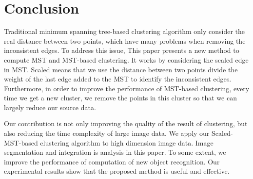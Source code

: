 \section{Conclusion}
	Traditional minimum spanning tree-based clustering algorithm only consider the real distance between two points, which have many problems when removing the inconsistent edges. To address this issue, This paper presents a new method to compute MST and MST-based clustering. It works by considering the scaled edge in MST. Scaled means that we use the distance between two points divide the weight of the last edge added to the MST to identify the inconsistent edges. Furthermore, in order to improve the performance of MST-based clustering, every time we get a new cluster, we remove the points in this cluster so that we can largely reduce our source data.   

	Our contribution is not only improving the quality of the result of clustering,  but also reducing the time complexity of large image data. We apply our Scaled-MST-based clustering algorithm to high dimension image data. Image segmentation and integration is analysis in this paper. To some extent, we improve the performance of computation of new object recognition. Our experimental results show that the proposed method is useful and effective. 